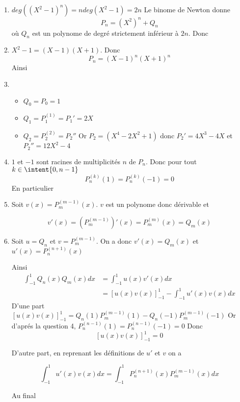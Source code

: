\documentclass[a4paper, 11pt,reqno]{article}
\begin{document}
\begin{correction}
\begin{enumerate}
\item $deg((X^2-1)^n )= n deg(X^2-1)=2n$
Le binome de Newton donne 
$$P_n =(X^2)^n +Q_n$$
où $Q_n$ est un polynome de degré strictement inférieur à $2n$. 
Donc 
\item $X^2-1 =(X-1)(X+1)$. Donc 
$$P_n = (X-1)^n (X+1)^n$$
Ainsi 

\item \begin{itemize}
\item$Q_0=P_0=1$
\item $Q_1= P_1^{(1)} = P_1'= 2X$
\item $Q_2 = P_2^{(2)} =P_2''$ Or $P_2 = (X^4-2X^2 +1)$ donc 
$P_2' = 4X^3-4X$ et $P_2'' =12X^2-4$
\end{itemize}
\item $1$ et $-1$ sont racines de multiplicités $n$ de $P_n$. Donc pour tout $k\in \intent{0, n-1}$ 
$$P_n^{(k)}(1) =P_n^{(k)}(-1)=0$$
En particulier 
\item Soit $v(x) =P_m^{(m-1)}(x)$.
$v$ est un polynome donc dérivable et 

$$v'(x) = \left(P_m^{(m-1)}\right)'(x)=P_m^{(m)}(x) =Q_m(x)$$

\item 
Soit $u =Q_n $ et $v=P_m^{(m-1)}$. On a donc 
$v'(x) = Q_m(x)$ et $u'(x) =P_n^{(n+1)}(x)$

Ainsi 
\begin{align*}
\int_{-1}^{1} Q_n(x) Q_m(x)dx &= \int_{-1}^{1} u(x) v'(x)dx\\
					&=\left[u(x) v(x)\right]_{-1}^{1} - \int_{-1}^1 u'(x) v(x)dx 
\end{align*}
D'une part 
$\left[u(x) v(x)\right]_{-1}^{1}= Q_n(1)P_m^{(m-1)}(1) -  Q_n(-1)P_m^{(m-1)}(-1)$ 
Or d'aprés la question 4, $P_n^{(n-1)}(1) =P_n^{(n-1)}(-1)=0$
Donc $$\left[u(x) v(x)\right]_{-1}^{1}=0$$

D'autre part, en reprenant les définitions de $u'$ et $v$ on a 

$$ \int_{-1}^1 u'(x) v(x)dx= \int_{-1}^{1} P_n^{(n+1)}(x) P_m^{(m-1)} (x)dx$$

Au final 



\end{enumerate}
\end{correction}
\end{document}
